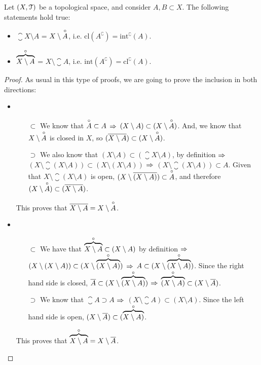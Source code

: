 \begin{theorem}
	\label{th:interior-closure-complement-relations}
	Let $(X,\EuScript{T})$ be a topological space, and consider $A, B\subset X$. The following statements hold true:
	\begin{itemize}
		\item $\closure{X\setminus A}$ = $X\setminus\overset{\circ}{A}$, i.e. $\mathrm{cl}(A^\complement)=\mathrm{int}^\complement(A)$.
		\item $\overbrace{X\setminus A}^{\circ}$ = $X\setminus\closure{A}$, i.e. $\mathrm{int}(A^\complement)=\mathrm{cl}^\complement(A)$.
	\end{itemize}
\end{theorem}
\begin{proof}
	As usual in this type of proofs, we are going to prove the inclusion in both directions:
\begin{itemize}
	\item \begin{itemize}
			  \item[$\boxed{\subset}$] We know that $\overset{\circ}{A}\subset A$ $\Rightarrow$ $(X\setminus A) \subset (X\setminus \overset{\circ}{A})$. And, we know that $X\setminus \overset{\circ}{A}$ is closed in $X$, so $(\overline{X\setminus A})\subset (X\setminus \overset{\circ}{A})$.
			  \item[$\boxed{\supset}$] We also know that $(X\setminus A) \subset (\closure{X\setminus A})$, by definition $\Rightarrow$ $(X\setminus \closure{(X\setminus A)}) \subset (X\setminus(X\setminus A))$ $\Rightarrow$ $(X\setminus \closure{(X\setminus A)})\subset A$. Given that $X\setminus \closure{(X\setminus A)}$ is open, $(X\setminus \overline{(X\setminus A)})\subset \overset{\circ}{A}$, and therefore $(X\setminus \overset{\circ}{A})\subset (\overline{X\setminus A})$.
	\end{itemize}
	This proves that $\overline{X\setminus A}=X\setminus \overset{\circ}{A}$.
	\item \begin{itemize}
			  \item[$\boxed{\subset}$] We have that $\overbrace{X\setminus A}^{\circ}\subset(X\setminus A)$ by definition $\Rightarrow$ $(X\setminus (X\setminus A))\subset (X\setminus\overbrace{(X\setminus A)}^{\circ})$ $\Rightarrow$ $A\subset (X\setminus\overbrace{(X\setminus A)}^{\circ})$. Since the right hand side is closed, $\overline{A}\subset (X\setminus\overbrace{(X\setminus A)}^{\circ})$ $\Rightarrow$ $\overbrace{(X\setminus A)}^{\circ}\subset (X\setminus\overline{A})$.
			  \item[$\boxed{\supset}$] We know that $\closure{A}\supset A$ $\Rightarrow$ $(X\setminus \closure{A})\subset (X\setminus A)$. Since the left hand side is open, $(X\setminus \overline{A})\subset (\overbrace{X\setminus A)}^{\circ}$.
	\end{itemize}
	This proves that $\overbrace{X\setminus A}^{\circ}=X\setminus \overline{A}$.
\end{itemize}
\end{proof}

